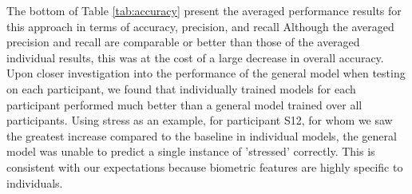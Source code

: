 The bottom  of Table \ref{tab:accuracy} present the averaged performance results for this approach in terms of accuracy, precision, and recall Although the averaged precision and recall are comparable or better than those of the averaged individual results, this was at the cost of a large decrease in overall accuracy.  Upon closer investigation into the performance of the general model when testing on each participant, we found that individually trained models for each participant performed much better than a general model trained over all participants. Using stress as an example, for participant S12, for whom we saw the greatest increase compared to the baseline in individual models, the general model was unable to predict a single instance of 'stressed' correctly. This is consistent with our expectations because biometric features are highly specific to individuals.



